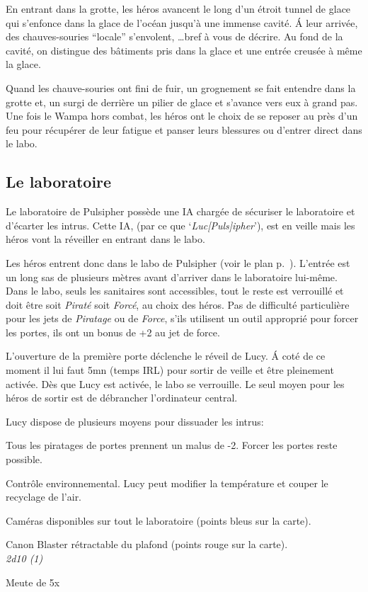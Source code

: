 En entrant dans la grotte, les héros avancent le long d’un étroit tunnel de glace qui s’enfonce dans la glace de l’océan jusqu’à une immense cavité. \'A leur arrivée, des chauves-souries “locale” s’envolent, \ldots bref à vous de décrire. Au fond de la cavité, on distingue des bâtiments pris dans la glace et une entrée creusée à même la glace.

Quand les chauve-souries ont fini de fuir, un grognement se fait entendre dans la grotte et, un  surgi de derrière un pilier de glace et s’avance vers eux à grand pas.\\

Une fois le Wampa hors combat, les héros ont le choix de se reposer au près d’un feu pour récupérer de leur fatigue et panser leurs blessures ou d’entrer direct dans le labo.

\subsection{Le laboratoire}

Le laboratoire de Pulsipher possède une IA chargée de sécuriser le laboratoire et d’écarter les intrus. Cette IA,  (par ce que ‘\emph{Luc[Puls]ipher}’), est en veille mais les héros vont la réveiller en entrant dans le labo. 

Les héros entrent donc dans le labo de Pulsipher (voir le plan p.~\pageref{sec:plan-labo-pulsipher}). L’entrée est un long sas de plusieurs mètres avant d’arriver dans le laboratoire lui-même. Dans le labo, seuls les sanitaires sont accessibles, tout le reste est verrouillé et doit être soit \textit{Piraté} soit \textit{Forcé}, au choix des héros. Pas de difficulté particulière pour les jets de \textit{Piratage} ou de \textit{Force}, s’ils utilisent un outil approprié pour forcer les portes, ils ont un bonus de +2 au jet de force.

L’ouverture de la première porte déclenche le réveil de Lucy. \'A coté de ce moment il lui faut 5mn (temps IRL) pour sortir de veille et être pleinement activée. Dès que Lucy est activée, le labo se verrouille. Le seul moyen pour les héros de sortir est de débrancher l’ordinateur central.

Lucy dispose de plusieurs moyens pour dissuader les intrus:
\begin{rebelist}
    \item Tous les piratages de portes prennent un malus de -2. Forcer les portes reste possible.
    \item Contrôle environnemental. Lucy peut modifier la température et couper le recyclage de l’air.
    \item Caméras disponibles sur tout le laboratoire (points bleus sur la carte).
    \item Canon Blaster rétractable du plafond (points rouge sur la carte).\\
        \textit{2d10 (1)}
    \item Meute de 5x 
\end{rebelist}

